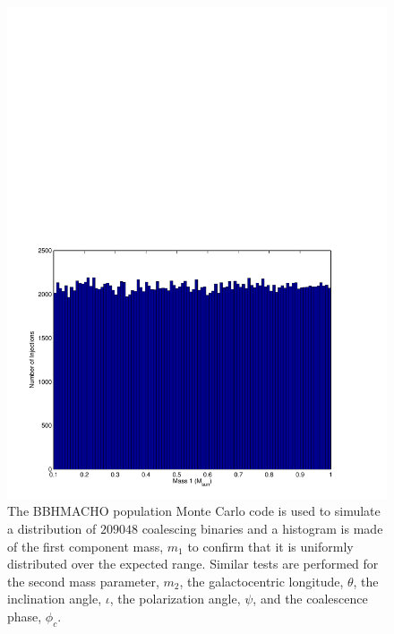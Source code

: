 \begin{figure}[p]
\begin{center}
\includegraphics[width=\linewidth]{figures/macho/m1_hist}
\end{center}
\caption[Histogram of BBHMACHO Monte Carlo Mass Distribution]{
\label{f:m1_hist}
The BBHMACHO population Monte Carlo code is used to simulate a distribution of
$209048$ coalescing binaries and a histogram is made of the first component
mass, $m_1$ to confirm that it is uniformly distributed over the expected
range.  Similar tests are performed for the second mass parameter, $m_2$, the
galactocentric longitude, $\theta$, the inclination angle, $\iota$, the
polarization angle, $\psi$, and the coalescence phase, $\phi_c$.
}
\end{figure}


